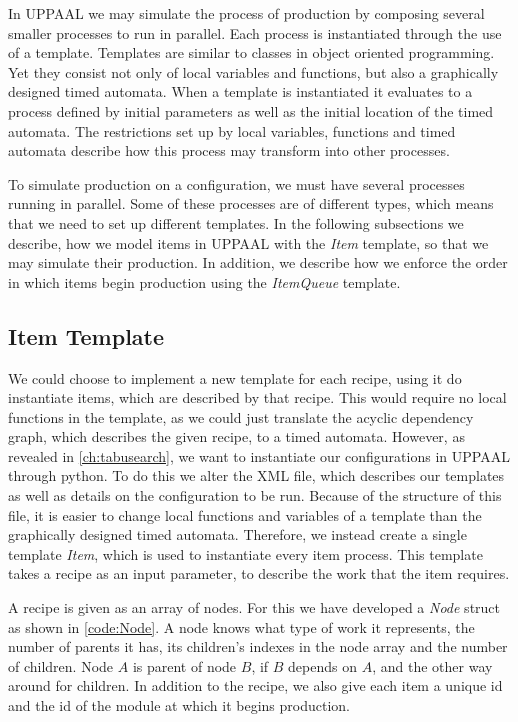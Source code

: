 In UPPAAL we may simulate the process of production by composing several smaller processes to run in parallel. Each process is instantiated through the use of a template. Templates are similar to classes in object oriented programming. Yet they consist not only of local variables and functions, but also a graphically designed timed automata. When a template is instantiated it evaluates to a process defined by initial parameters as well as the initial location of the timed automata. The restrictions set up by local variables, functions and timed automata  describe how this process may transform into other processes.   

To simulate production on a configuration, we must have several processes running in parallel. Some of these processes are of different types, which means that we need to set up different templates. In the following subsections we describe, how we model items in UPPAAL with the \textit{Item} template, so that we may simulate their production. In addition, we describe how we enforce the order in which items begin production using the \textit{ItemQueue} template.

\subsection{Item Template}\label{subs:recipe}
We could choose to implement a new template for each recipe, using it do instantiate items, which are described by that recipe. This would require no local functions in the template, as we could just translate the acyclic dependency graph, which describes the given recipe, to a timed automata. However, as revealed in \cref{ch:tabusearch}, we want to  instantiate our configurations in UPPAAL through python. To do this we alter the XML file, which describes our templates as well as details on the configuration to be run. Because of the structure of this file, it is easier to change local functions and variables of a template than the graphically designed timed automata. Therefore, we instead create a single template \textit{Item}, which is used to instantiate every item process. This template takes a recipe as an input parameter, to describe the work that the item requires.

A recipe is given as an array of nodes. For this we have developed a \textit{Node} struct as shown in \cref{code:Node}. A node knows what type of work it represents, the number of parents it has, its children's indexes in the node array and the number of children. Node $A$ is parent of node $B$, if $B$ depends on $A$, and the other way around for children. In addition to the recipe, we also give each item a unique id and the id of the module at which it begins production. 

